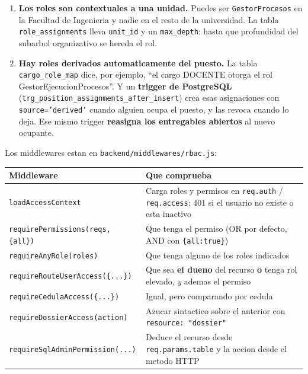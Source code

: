 \documentclass[11pt,a4paper,oneside]{report}
\newcommand{\rt}[1]{\texttt{#1}}
\begin{document}
\begin{enumerate}[leftmargin=1.6em]
  \item \textbf{Los roles son contextuales a una unidad.} Puedes ser \rt{GestorProcesos} en la
        Facultad de Ingenieria y nadie en el resto de la universidad. La tabla
        \rt{role\_assignments} lleva \rt{unit\_id} y un \rt{max\_depth}: hasta que profundidad
        del subarbol organizativo se hereda el rol.
  \item \textbf{Hay roles derivados automaticamente del puesto.} La tabla \rt{cargo\_role\_map}
        dice, por ejemplo, ``el cargo DOCENTE otorga el rol GestorEjecucionProcesos''. Y un
        \textbf{trigger de PostgreSQL} (\rt{trg\_position\_assignments\_after\_insert}) crea
        esas asignaciones con \rt{source='derived'} cuando alguien ocupa el puesto, y las
        revoca cuando lo deja. Ese mismo trigger \textbf{reasigna los entregables abiertos} al
        nuevo ocupante.
\end{enumerate}

Los middlewares estan en \rt{backend/middlewares/rbac.js}:

\begin{center}
\footnotesize
\begin{tabularx}{\textwidth}{@{}P{6.2cm}L@{}}
\toprule
\textbf{Middleware} & \textbf{Que comprueba} \\
\midrule
\rt{loadAccessContext}                & Carga roles y permisos en \rt{req.auth} / \rt{req.access}; 401 si el usuario no existe o esta inactivo \\
\rt{requirePermissions(reqs, \{all\})}& Que tenga el permiso (OR por defecto, AND con \rt{\{all:true\}}) \\
\rt{requireAnyRole(roles)}            & Que tenga alguno de los roles indicados \\
\rt{requireRouteUserAccess(\{...\})}  & Que sea \textbf{el dueno} del recurso \textbf{o} tenga rol elevado, \emph{y} ademas el permiso \\
\rt{requireCedulaAccess(\{...\})}     & Igual, pero comparando por cedula \\
\rt{requireDossierAccess(action)}     & Azucar sintactico sobre el anterior con \rt{resource: "dossier"} \\
\rt{requireSqlAdminPermission(...)}   & Deduce el recurso desde \rt{req.params.table} y la accion desde el metodo HTTP \\
\bottomrule
\end{tabularx}
\end{center}
\end{document}
